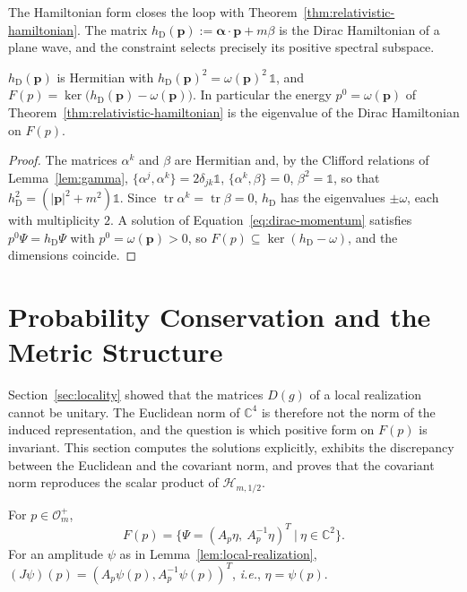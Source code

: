 	The Hamiltonian form closes the loop with Theorem~\ref{thm:relativistic-hamiltonian}. The matrix $h_{\mathrm{D}}(\mathbf{p}):=\boldsymbol{\alpha}\cdot\mathbf{p}+m\beta$ is the Dirac Hamiltonian of a plane wave, and the constraint selects precisely its positive spectral subspace.
	
	\begin{proposition}\label{prop:dirac-hamiltonian}
		$h_{\mathrm{D}}(\mathbf{p})$ is Hermitian with $h_{\mathrm{D}}(\mathbf{p})^2=\omega(\mathbf{p})^2\,\mathbb{1}$, and $F(p)=\ker\big(h_{\mathrm{D}}(\mathbf{p})-\omega(\mathbf{p})\big)$. In particular the energy $p^0=\omega(\mathbf{p})$ of Theorem~\ref{thm:relativistic-hamiltonian} is the eigenvalue of the Dirac Hamiltonian on $F(p)$.
	\end{proposition}
	
	\begin{proof}
		The matrices $\alpha^k$ and $\beta$ are Hermitian and, by the Clifford relations of Lemma~\ref{lem:gamma}, $\{\alpha^j,\alpha^k\}=2\delta_{jk}\mathbb{1}$, $\{\alpha^k,\beta\}=0$, $\beta^2=\mathbb{1}$, so that $h_{\mathrm{D}}^2=(|\mathbf{p}|^2+m^2)\mathbb{1}$. Since $\operatorname{tr}\alpha^k=\operatorname{tr}\beta=0$, $h_{\mathrm{D}}$ has the eigenvalues $\pm\omega$, each with multiplicity $2$. A solution of Equation~\eqref{eq:dirac-momentum} satisfies $p^0\Psi=h_{\mathrm{D}}\Psi$ with $p^0=\omega(\mathbf{p})>0$, so $F(p)\subseteq\ker(h_{\mathrm{D}}-\omega)$, and the dimensions coincide.
	\end{proof}
	
	\section{Probability Conservation and the Metric Structure}
	\label{sec:probability}
	
	Section~\ref{sec:locality} showed that the matrices $D(g)$ of a local realization cannot be unitary. The Euclidean norm of $\mathbb{C}^4$ is therefore not the norm of the induced representation, and the question is which positive form on $F(p)$ is invariant. This section computes the solutions explicitly, exhibits the discrepancy between the Euclidean and the covariant norm, and proves that the covariant norm reproduces the scalar product of $\mathcal{H}_{m,1/2}$.
	
	\begin{proposition}\label{prop:explicit-solutions}
		For $p\in\mathcal{O}_m^+$,
		\begin{equation*}
			F(p)=\big\{\Psi=(A_p\eta,\ A_p^{-1}\eta)^T\ \big|\ \eta\in\mathbb{C}^2\big\}.
		\end{equation*}
		For an amplitude $\psi$ as in Lemma~\ref{lem:local-realization}, $(J\psi)(p)=(A_p\psi(p),A_p^{-1}\psi(p))^T$, \textit{i.e.}, $\eta=\psi(p)$.
	\end{proposition}
	
